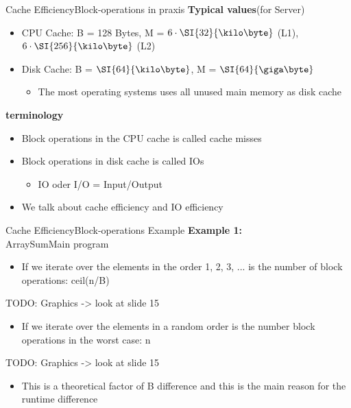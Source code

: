 \begin{frame}{Cache Efficiency}{Block-operations in praxis}
	\textbf{Typical values}(for Server)
	\begin{itemize}
		\item
			CPU Cache: B = 128 Bytes, M = $6 \cdot \SI{32}{\kilo \byte}$ (L1),\\
			 $6 \cdot \SI{256}{\kilo \byte}$ (L2)
		\item
			Disk Cache: B = $\SI{64}{\kilo \byte}$, M = $\SI{64}{\giga \byte}$
		\begin{itemize}
			\item
				The most operating systems uses all unused main memory as disk cache
		\end{itemize}
	\end{itemize}
	\textbf{terminology}
	\begin{itemize}
		\item
			Block operations in the CPU cache is called cache misses
		\item
			Block operations in disk cache is called IOs
		\begin{itemize}
			\item
				IO oder I/O = Input/Output
		\end{itemize}
		\item
			We talk about cache efficiency and IO efficiency
	\end{itemize}
\end{frame}


\begin{frame}{Cache Efficiency}{Block-operations Example}
	\textbf{Example 1:}\\
	ArraySumMain program
	\begin{itemize}
		\item
			If we iterate over the elements in the order 1, 2, 3, ... is the number 
			of block operations: ceil(n/B)
	\end{itemize}
	
	TODO: Graphics -> look at slide 15 \vspace{2em}
	
	\begin{itemize}
		\item
			If we iterate over the elements in a random order is the number block 
			operations in the worst case: n
	\end{itemize}
		
		TODO: Graphics -> look at slide 15 \vspace{2em}
		
	\begin{itemize}
		\item
			This is a theoretical factor of B difference and this is the main reason 
			for the runtime difference
	\end{itemize}
\end{frame}

